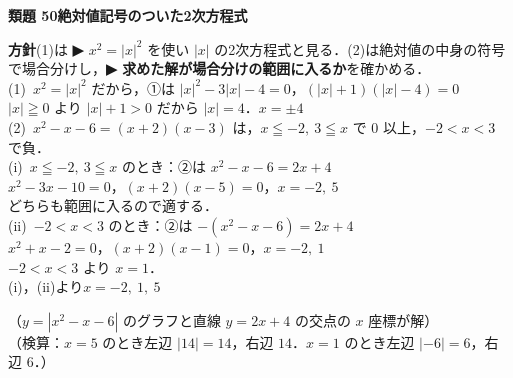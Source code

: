 \documentclass[a4paper,11pt]{ltjsarticle}
\newcommand{\ans}[2]{\Needspace{5\baselineskip}\vspace{6pt}%
  {\sffamily\bfseries 類題 #1\quad #2}\par}
\newcommand{\point}[1]{\textsf{\bfseries ▶ #1}}
\newcommand{\ax}[4]{\draw[->] (#1,0)--(#2,0) node[right]{\scriptsize $x$};
  \draw[->] (0,#3)--(0,#4) node[above]{\scriptsize $y$};
  \node[below left] at (0,0){\scriptsize O};}
\begin{document}
\ans{50}{絶対値記号のついた2次方程式}
\begin{kai}
\textbf{方針}\quad (1)は \point{$x^2=|x|^2$} を使い $|x|$ の2次方程式と見る．(2)は絶対値の中身の符号で場合分けし，\point{求めた解が場合分けの範囲に入るか}を確かめる．\\[2pt]
(1)\ $x^2=|x|^2$ だから，①は $|x|^2-3|x|-4=0$，\quad $(|x|+1)(|x|-4)=0$\\
\hspace*{1.5em}$|x|\geqq0$ より $|x|+1>0$ だから $|x|=4$．\quad $x=\pm4$\\[2pt]
(2)\ $x^2-x-6=(x+2)(x-3)$ は，$x\leqq-2,\ 3\leqq x$ で $0$ 以上，$-2<x<3$ で負．\\[2pt]
\hspace*{1.5em}(i)\ $x\leqq-2,\ 3\leqq x$ のとき：②は $x^2-x-6=2x+4$\\
\hspace*{3em}$x^2-3x-10=0$，\quad $(x+2)(x-5)=0$，\quad $x=-2,\ 5$\\
\hspace*{3em}どちらも範囲に入るので適する．\\
\hspace*{1.5em}(ii)\ $-2<x<3$ のとき：②は $-(x^2-x-6)=2x+4$\\
\hspace*{3em}$x^2+x-2=0$，\quad $(x+2)(x-1)=0$，\quad $x=-2,\ 1$\\
\hspace*{3em}$-2<x<3$ より $x=1$．\\[2pt]
\hspace*{1.5em}(i)，(ii)より\quad $x=-2,\ 1,\ 5$\\
\begin{center}
\end{center}
\hspace*{1.5em}（$y=|x^2-x-6|$ のグラフと直線 $y=2x+4$ の交点の $x$ 座標が解）\\
\hspace*{1.5em}（検算：$x=5$ のとき左辺 $|14|=14$，右辺 $14$．$x=1$ のとき左辺 $|-6|=6$，右辺 $6$．）
\end{kai}
\end{document}
